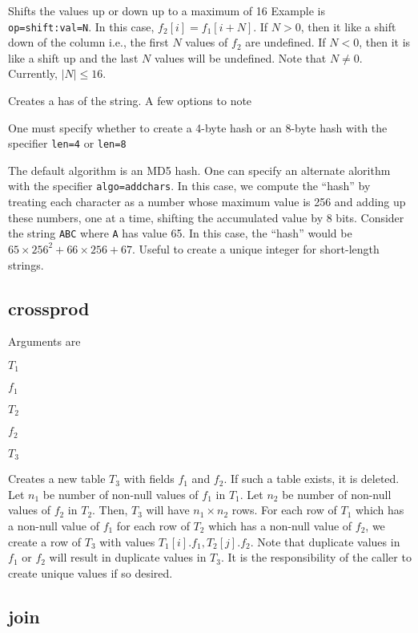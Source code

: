 \item [SHIFT] Shifts the values up or down up to a maximum of 16
Example is \verb+op=shift:val=N+. In this case,
\(f_2[i] = f_1[i+N]\). If \(N > 0 \), then it like a shift down
of the column i.e., the first \(N\) values of \(f_2\) are undefined. If
\(N < 0\), then it is like a shift up and the last \(N\) values will be
undefined. Note that \(N \neq 0\). Currently, \(|N| \leq 16\).

\item [HASH] Creates a has of the string. A few options to note
\be
\item One must specify whether to create a 4-byte hash or an 8-byte hash
with the specifier \verb+len=4+ or \verb+len=8+
\item The default algorithm is an MD5 hash. One can specify an alternate
alorithm with the specifier \verb+algo=addchars+. In this case, we
compute the ``hash'' by treating each character as a number whose maximum
value is 256 and adding up these numbers, one at a time, shifting the
accumulated value by 8 bits. Consider the string {\tt ABC} where {\tt A}
has value 65. In this case, the ``hash'' would be \(65 \times {256}^2 + 66
\times 256 + 67\). Useful to create a unique integer for short-length
strings.
\ee
\ed

\subsection{crossprod}
\label{crossprod}

Arguments are 
\be
\item \(T_1\)
\item \(f_1\)
\item \(T_2\)
\item \(f_2\)
\item \(T_3\)
\ee

Creates a new table \(T_3\) with fields \(f_1\) and \(f_2\).  If such a
table exists, it is deleted. 
Let \(n_1\) be number of non-null values of \(f_1\) in \(T_1\).
Let \(n_2\) be number of non-null values of \(f_2\) in \(T_2\).
Then, \(T_3\) will have \(n_1 \times n_2\) rows. 
For each row of \(T_1\) which has a non-null value of \(f_1\)
for each row of \(T_2\) which has a non-null value of \(f_2\),
we create a row of \(T_3\) with values \(T_1[i].f_1, T_2[j].f_2\). Note
that duplicate values in \(f_1\) or \(f_2\) will result in duplicate
values in \(T_3\). It is the responsibility of the caller to create
unique values if so desired.

\subsection{join}
\label{join}


